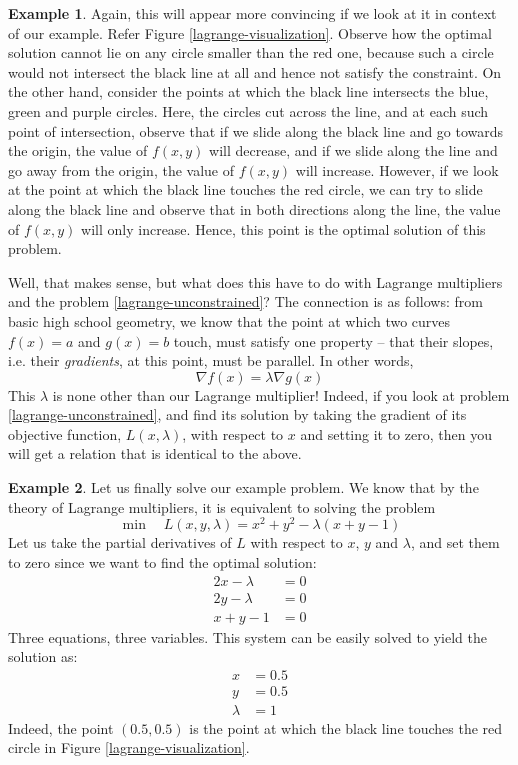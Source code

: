 \documentclass[a4paper]{article}
\theoremstyle{definition}
\newtheorem{example}{Example}[subsection]
\begin{document}
\begin{example}
	Again, this will appear more convincing if we look at it in context of our example.
	Refer Figure \ref{lagrange-visualization}.
	Observe how the optimal solution cannot lie on any circle smaller than the red one, because such a circle would not intersect the black line at all and hence not satisfy the constraint.
	On the other hand, consider the points at which the black line intersects the blue, green and purple circles.
	Here, the circles cut across the line, and at each such point of intersection, observe that if we slide along the black line and go towards the origin, the value of $f(x, y)$ will decrease, and if we slide along the line and go away from the origin, the value of $f(x, y)$ will increase.
	However, if we look at the point at which the black line touches the red circle, we can try to slide along the black line and observe that in both directions along the line, the value of $f(x, y)$ will only increase.
	Hence, this point is the optimal solution of this problem.
\end{example}

Well, that makes sense, but what does this have to do with Lagrange multipliers and the problem \eqref{lagrange-unconstrained}?
The connection is as follows: from basic high school geometry, we know that the point at which two curves $f(x) = a$ and $g(x) = b$ touch, must satisfy one property -- that their slopes, i.e. their \textit{gradients}, at this point, must be parallel.
In other words,
\begin{equation*}
	\nabla f(x) = \lambda \nabla g(x)
\end{equation*}
This $\lambda$ is none other than our Lagrange multiplier!
Indeed, if you look at problem \eqref{lagrange-unconstrained}, and find its solution by taking the gradient of its objective function, $L(x, \lambda)$, with respect to $x$ and setting it to zero, then you will get a relation that is identical to the above.

\begin{example}
	Let us finally solve our example problem.
	We know that by the theory of Lagrange multipliers, it is equivalent to solving the problem
	\begin{equation*}
		\min \quad L(x, y, \lambda) = x^2 + y^2 - \lambda(x + y - 1)
	\end{equation*}
	Let us take the partial derivatives of $L$ with respect to $x$, $y$ and $\lambda$, and set them to zero since we want to find the optimal solution:
	\begin{align*}
		2x - \lambda & = 0 \\
		2y - \lambda & = 0 \\
		x + y - 1 & = 0
	\end{align*}
	Three equations, three variables.
	This system can be easily solved to yield the solution as:
	\begin{align*}
		x & = 0.5 \\
		y & = 0.5 \\
		\lambda & = 1
	\end{align*}
	Indeed, the point $(0.5, 0.5)$ is the point at which the black line touches the red circle in Figure \ref{lagrange-visualization}.
\end{example}
\end{document}
